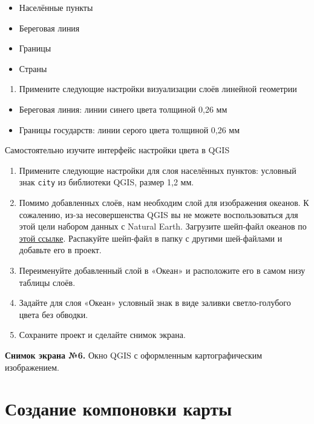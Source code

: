 \documentclass[
  12pt,
]{book}
\providecommand{\tightlist}{%
  \setlength{\itemsep}{0pt}\setlength{\parskip}{0pt}}
\begin{document}
\begin{itemize}
\tightlist
\item
  Населённые пункты
\item
  Береговая линия
\item
  Границы
\item
  Страны
\end{itemize}

\begin{enumerate}
\def\labelenumi{\arabic{enumi}.}
\setcounter{enumi}{4}
\tightlist
\item
  Примените следующие настройки визуализации слоёв линейной геометрии
\end{enumerate}

\begin{itemize}
\tightlist
\item
  Береговая линия: линии синего цвета толщиной 0,26 мм
\item
  Границы государств: линии серого цвета толщиной 0,26 мм
\end{itemize}

Самостоятельно изучите интерфейс настройки цвета в QGIS

\begin{enumerate}
\def\labelenumi{\arabic{enumi}.}
\setcounter{enumi}{5}
\item
  Примените следующие настройки для слоя населённых пунктов: условный знак \texttt{city} из библиотеки QGIS, размер 1,2 мм.
\item
  Помимо добавленных слоёв, нам необходим слой для изображения океанов. К сожалению, из-за несовершенства QGIS вы не можете воспользоваться для этой цели набором данных с Natural Earth. Загрузите шейп-файл океанов по \href{https://1drv.ms/u/s!AmtmZDq3JgxHgZswh2sFnErE-JEmGw?e=xoZW4c}{этой ссылке}. Распакуйте шейп-файл в папку с другими шей-файлами и добавьте его в проект.
\item
  Переименуйте добавленный слой в «Океан» и расположите его в самом низу таблицы слоёв.
\item
  Задайте для слоя «Океан» условный знак в виде заливки светло-голубого цвета без обводки.
\item
  Сохраните проект и сделайте снимок экрана.
\end{enumerate}

\textbf{Снимок экрана №6.} Окно QGIS с оформленным картографическим изображением.

\hypertarget{map-design-world-layout}{%
\section{Создание компоновки карты}\label{map-design-world-layout}}
\end{document}

